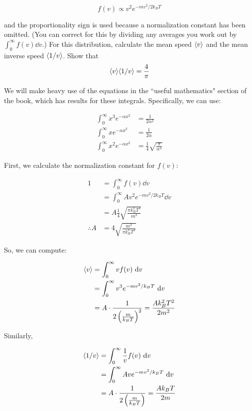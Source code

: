 \documentclass{article}
\begin{document}
    \[ f(v) \propto v^2 e^{-mv^2/2k_BT}\]

    and the proportionality sign is used because a normalization constant has been omitted. (You can correct for this by dividing any averages you work out by $\int_0^\infty f(v) \dd v$.) For this distribution, calculate the mean speed $\langle v \rangle$ and the mean inverse speed $\langle 1/v \rangle$. Show that
    \[ \langle v \rangle \langle 1/v \rangle = \frac{4}{\pi}\]


    \begin{solution}
        We will make heavy use of the equations in the ``useful mathematics" section of the book, which has results for these integrals. Specifically, we can use:
        
        \begin{align*}
            \int_0^\infty x^3 e^{-\alpha x^2} &= \frac{1}{2\alpha^2}\\
            \int_0^\infty xe^{-\alpha x^2} &= \frac{1}{2\alpha}\\
            \int_0^\infty x^2e^{-\alpha x^2} &= \frac{1}{4}\sqrt{\frac{\pi}{\alpha^3}}
        \end{align*}

        First, we calculate the normalization constant for $f(v)$:

        \begin{align*}
            1 &= \int_0^\infty f(v) \dd v \\
            &= \int_0^\infty Av^2 e^{-mv^2/2k_BT} \dd v\\
            &= A \frac{1}{4} \sqrt{\frac{\pi k_B^3 T^3}{m^3}}\\
            \therefore A &= 4 \sqrt{\frac{m^3}{\pi k_B^3 T^3}} 
        \end{align*}
        
        So, we can compute:
        
        \begin{align*}
            \langle v \rangle &= \int_0^\infty v f(v) \ \mathrm d v\\
            &= \int_0^\infty v^3e^{-mv^2/k_BT} \ \mathrm d v\\
            &= A \cdot \frac{1}{2\left(\frac{m}{k_BT}\right)^2} = \frac{A k_B^2T^2}{2m^2}
        \end{align*}

        Similarly, 

        \begin{align*}
            \langle 1/v \rangle&= \int_0^\infty \frac{1}{v} f(v) \ \mathrm d v\\
            &= \int_0^\infty A ve^{-mv^2/k_BT} \ \mathrm d v \\
            &= A \cdot \frac{1}{2\left(\frac{m}{k_BT}\right)} = \frac{A k_BT}{2m}
        \end{align*}


\end{solution}
\end{document}
